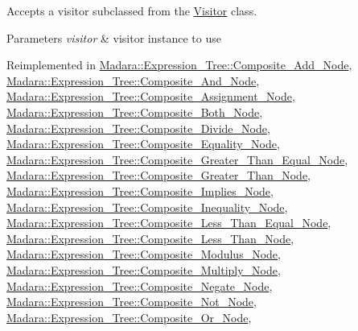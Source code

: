 Accepts a visitor subclassed from the \hyperlink{classMadara_1_1Expression__Tree_1_1Visitor}{Visitor} class. 


\begin{DoxyParams}{Parameters}
{\em visitor} & visitor instance to use \\
\hline
\end{DoxyParams}


Reimplemented in \hyperlink{classMadara_1_1Expression__Tree_1_1Composite__Add__Node_af0f45a8cfcb75f6c1d05bb0e955def10}{Madara::Expression\_\-Tree::Composite\_\-Add\_\-Node}, \hyperlink{classMadara_1_1Expression__Tree_1_1Composite__And__Node_a7bfbeebb5c90625a79ec0cb19e17c118}{Madara::Expression\_\-Tree::Composite\_\-And\_\-Node}, \hyperlink{classMadara_1_1Expression__Tree_1_1Composite__Assignment__Node_a834155d24ce5366cfcfc943ced4e5df2}{Madara::Expression\_\-Tree::Composite\_\-Assignment\_\-Node}, \hyperlink{classMadara_1_1Expression__Tree_1_1Composite__Both__Node_a2d20ccb951c3da415e8a9b4f352766d2}{Madara::Expression\_\-Tree::Composite\_\-Both\_\-Node}, \hyperlink{classMadara_1_1Expression__Tree_1_1Composite__Divide__Node_a4ef185628577b4e0faae08e3c2061117}{Madara::Expression\_\-Tree::Composite\_\-Divide\_\-Node}, \hyperlink{classMadara_1_1Expression__Tree_1_1Composite__Equality__Node_ab16daffb4e02f8020db7820ec4af6c90}{Madara::Expression\_\-Tree::Composite\_\-Equality\_\-Node}, \hyperlink{classMadara_1_1Expression__Tree_1_1Composite__Greater__Than__Equal__Node_a48cbea410ff056c7fbfc714e4247ce3c}{Madara::Expression\_\-Tree::Composite\_\-Greater\_\-Than\_\-Equal\_\-Node}, \hyperlink{classMadara_1_1Expression__Tree_1_1Composite__Greater__Than__Node_a58e3e46c3b4268c2de62073245f7a6eb}{Madara::Expression\_\-Tree::Composite\_\-Greater\_\-Than\_\-Node}, \hyperlink{classMadara_1_1Expression__Tree_1_1Composite__Implies__Node_ae06d733f3d3c3a5d37a1507ae0200ba9}{Madara::Expression\_\-Tree::Composite\_\-Implies\_\-Node}, \hyperlink{classMadara_1_1Expression__Tree_1_1Composite__Inequality__Node_a667aea651666d9a0887745b8c5c88cff}{Madara::Expression\_\-Tree::Composite\_\-Inequality\_\-Node}, \hyperlink{classMadara_1_1Expression__Tree_1_1Composite__Less__Than__Equal__Node_ac2f05f3c1b8fc7e9cb49e35caf1364d0}{Madara::Expression\_\-Tree::Composite\_\-Less\_\-Than\_\-Equal\_\-Node}, \hyperlink{classMadara_1_1Expression__Tree_1_1Composite__Less__Than__Node_afac850cf366738cdfd9079235c8dcfe0}{Madara::Expression\_\-Tree::Composite\_\-Less\_\-Than\_\-Node}, \hyperlink{classMadara_1_1Expression__Tree_1_1Composite__Modulus__Node_a884f6c53634eca04be8c37a6b725f6e1}{Madara::Expression\_\-Tree::Composite\_\-Modulus\_\-Node}, \hyperlink{classMadara_1_1Expression__Tree_1_1Composite__Multiply__Node_afa9e40ed0ce1a86b99e77aa5dd66cb58}{Madara::Expression\_\-Tree::Composite\_\-Multiply\_\-Node}, \hyperlink{classMadara_1_1Expression__Tree_1_1Composite__Negate__Node_a35f42733f97befd885ceca35282f228c}{Madara::Expression\_\-Tree::Composite\_\-Negate\_\-Node}, \hyperlink{classMadara_1_1Expression__Tree_1_1Composite__Not__Node_a4123f66ae7ef032f6e8518f766473de1}{Madara::Expression\_\-Tree::Composite\_\-Not\_\-Node}, \hyperlink{classMadara_1_1Expression__Tree_1_1Composite__Or__Node_a947941a0f7a13ddc13f03040c3734964}{Madara::Expression\_\-Tree::Composite\_\-Or\_\-Node}, 